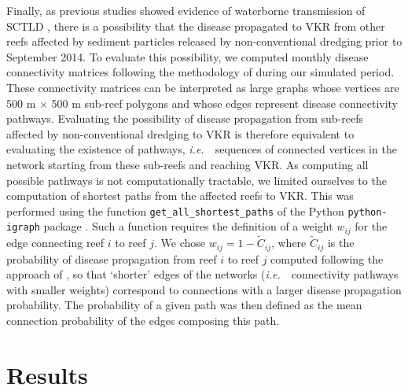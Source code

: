 \documentclass[preprint,12pt,authoryear]{elsarticle}
\newcommand{\ie}{{\it i.e.}\ }
\begin{document}
Finally, as previous studies showed evidence of waterborne transmission of SCTLD \citep{aeby2019pathogenesis, dobbelaere2020coupled,eaton2021measuring, meiling2021variable}, there is a possibility that the disease propagated to VKR from other reefs affected by sediment particles released by non-conventional dredging prior to September 2014. To evaluate this possibility, we computed monthly disease connectivity matrices following the methodology of \cite{dobbelaere2020coupled} during our simulated period. These connectivity matrices can be interpreted as large graphs whose vertices are 500 m $\times$ 500 m sub-reef polygons and whose edges represent disease connectivity pathways. Evaluating the possibility of disease propagation from sub-reefs affected by non-conventional dredging to VKR is therefore equivalent to evaluating the existence of pathways, \ie~sequences of connected vertices in the network starting from these sub-reefs and reaching VKR. As computing all possible pathways is not computationally tractable, we limited ourselves to the computation of shortest paths from the affected reefs to VKR. This was performed using the function \texttt{get\_all\_shortest\_paths} of the Python \texttt{python-igraph} package \citep{csardi2006igraph}. Such a function requires the definition of a weight $w_{ij}$ for the edge connecting reef $i$ to reef $j$. We chose $w_{ij} = 1-\tilde{C}_{ij}$, where $\tilde{C}_{ij}$ is the probability of disease propagation from reef $i$ to reef $j$ computed following the approach of \cite{dobbelaere2020coupled}, so that `shorter' edges of the networks (\ie~connectivity pathways with smaller weights) correspond to connections with a larger disease propagation probability. The probability of a given path was then defined as the mean connection probability of the edges composing this path.


\section{Results}
\end{document}
